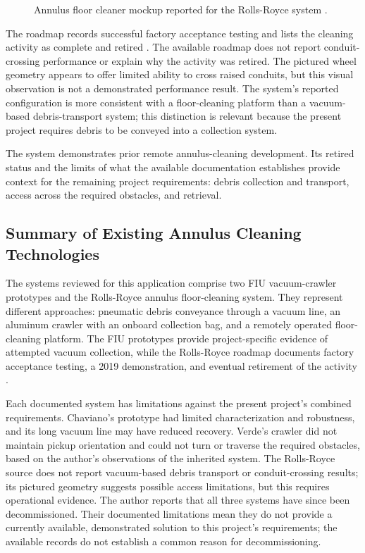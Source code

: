 \begin{figure}[H]
\centering
{}
\caption[Rolls-Royce annulus floor cleaner mockup]{Annulus floor cleaner mockup reported for the Rolls-Royce system \citep{hanford2022AnnulusCleaner}.}
\label{fig:rolls-royce-cleaner}
\end{figure}

The roadmap records successful factory acceptance testing and lists the cleaning activity as complete and retired \citep{hanford2022AnnulusCleaner}. The available roadmap does not report conduit-crossing performance or explain why the activity was retired. The pictured wheel geometry appears to offer limited ability to cross raised conduits, but this visual observation is not a demonstrated performance result. The system's reported configuration is more consistent with a floor-cleaning platform than a vacuum-based debris-transport system; this distinction is relevant because the present project requires debris to be conveyed into a collection system.

The system demonstrates prior remote annulus-cleaning development. Its retired status and the limits of what the available documentation establishes provide context for the remaining project requirements: debris collection and transport, access across the required obstacles, and retrieval.

\subsection{Summary of Existing Annulus Cleaning Technologies}
\label{sec:annulus-cleaning-technology-summary}
The systems reviewed for this application comprise two FIU vacuum-crawler prototypes and the Rolls-Royce annulus floor-cleaning system. They represent different approaches: pneumatic debris conveyance through a vacuum line, an aluminum crawler with an onboard collection bag, and a remotely operated floor-cleaning platform. The FIU prototypes provide project-specific evidence of attempted vacuum collection, while the Rolls-Royce roadmap documents factory acceptance testing, a 2019 demonstration, and eventual retirement of the activity \citep{chaviano2025Crawler,verde2025Crawler,hanford2022AnnulusCleaner}.

Each documented system has limitations against the present project's combined requirements. Chaviano's prototype had limited characterization and robustness, and its long vacuum line may have reduced recovery. Verde's crawler did not maintain pickup orientation and could not turn or traverse the required obstacles, based on the author's observations of the inherited system. The Rolls-Royce source does not report vacuum-based debris transport or conduit-crossing results; its pictured geometry suggests possible access limitations, but this requires operational evidence. The author reports that all three systems have since been decommissioned. Their documented limitations mean they do not provide a currently available, demonstrated solution to this project's requirements; the available records do not establish a common reason for decommissioning.

